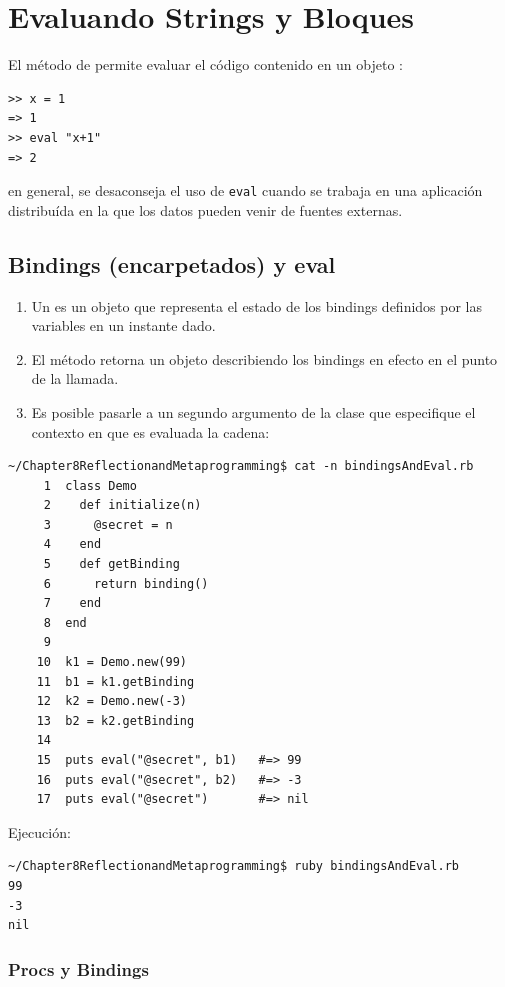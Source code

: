 \section{Evaluando Strings y Bloques}

El método   de \Kernel{}
permite evaluar el código contenido en un objeto :
\begin{verbatim}
>> x = 1
=> 1
>> eval "x+1"
=> 2
\end{verbatim}

en general, se desaconseja 
el uso de \verb|eval| cuando se trabaja en una aplicación 
distribuída en la que los datos pueden venir de fuentes externas.

  \subsection{Bindings (encarpetados) y eval}
   
\begin{enumerate}
\item 
Un  es un objeto que representa el estado de los bindings 
definidos por las variables en un instante dado.

\item 
El método  retorna un objeto \Binding{} describiendo
los bindings en efecto en el punto de la llamada.

\item 
Es posible pasarle a 
un segundo argumento de la clase 
que especifique el contexto en que es evaluada la cadena:
\end{enumerate}
\begin{verbatim}
~/Chapter8ReflectionandMetaprogramming$ cat -n bindingsAndEval.rb 
     1  class Demo
     2    def initialize(n)
     3      @secret = n
     4    end
     5    def getBinding
     6      return binding()
     7    end
     8  end
     9  
    10  k1 = Demo.new(99)
    11  b1 = k1.getBinding
    12  k2 = Demo.new(-3)
    13  b2 = k2.getBinding
    14  
    15  puts eval("@secret", b1)   #=> 99
    16  puts eval("@secret", b2)   #=> -3
    17  puts eval("@secret")       #=> nil
\end{verbatim}
Ejecución:
\begin{verbatim}
~/Chapter8ReflectionandMetaprogramming$ ruby bindingsAndEval.rb 
99
-3
nil

\end{verbatim}

\subsubsection{Procs y Bindings}

